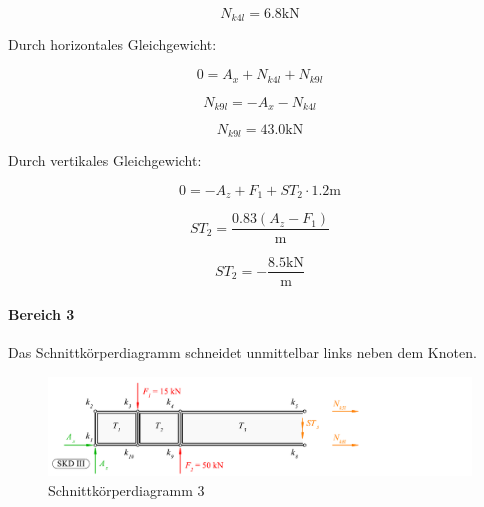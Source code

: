 \documentclass[
  12pt,
  letterpaper,
  DIV=11,
  egregdoesnotlikesansseriftitles]{scrartcl}
\let\oldparagraph\paragraph
\renewcommand{\paragraph}[1]{\oldparagraph{#1}\mbox{}}
\begin{document}
\begin{equation}N_{k4l} = 6.8 \text{k} \text{N}\end{equation}

Durch horizontales Gleichgewicht:

\begin{equation}0 = A_{x} + N_{k4l} + N_{k9l}\end{equation}

\begin{equation}N_{k9l} = - A_{x} - N_{k4l}\end{equation}

\begin{equation}N_{k9l} = 43.0 \text{k} \text{N}\end{equation}

Durch vertikales Gleichgewicht:

\begin{equation}0 = - A_{z} + F_{1} + ST_{2} \cdot 1.2 \text{m}\end{equation}

\begin{equation}ST_{2} = \frac{0.83 \left(A_{z} - F_{1}\right)}{\text{m}}\end{equation}

\begin{equation}ST_{2} = - \frac{8.5 \text{k} \text{N}}{\text{m}}\end{equation}

\hypertarget{bereich-3}{%
\paragraph{Bereich 3}\label{bereich-3}}

Das Schnittkörperdiagramm schneidet unmittelbar links neben dem Knoten.

\begin{figure}[H]

{\centering \includegraphics{BSI_HS23_Testat_03_files/mediabag/../images/Testat_03_HS23_SKD2.pdf}

}

\caption{\label{fig-skd3}Schnittkörperdiagramm 3}

\end{figure}
\end{document}
